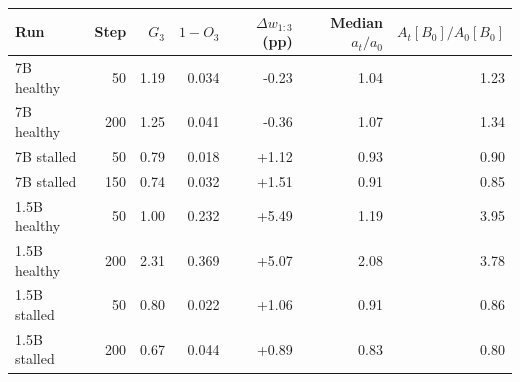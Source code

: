 \begin{tabular}{lrrrrrr}
\toprule
Run & Step & $G_3$ & $1-O_3$ & $\Delta w_{1:3}$ (pp) & Median $a_t/a_0$ & $A_t[B_0]/A_0[B_0]$ \\
\midrule
7B healthy & 50 & 1.19 & 0.034 & -0.23 & 1.04 & 1.23 \\
7B healthy & 200 & 1.25 & 0.041 & -0.36 & 1.07 & 1.34 \\
7B stalled & 50 & 0.79 & 0.018 & +1.12 & 0.93 & 0.90 \\
7B stalled & 150 & 0.74 & 0.032 & +1.51 & 0.91 & 0.85 \\
1.5B healthy & 50 & 1.00 & 0.232 & +5.49 & 1.19 & 3.95 \\
1.5B healthy & 200 & 2.31 & 0.369 & +5.07 & 2.08 & 3.78 \\
1.5B stalled & 50 & 0.80 & 0.022 & +1.06 & 0.91 & 0.86 \\
1.5B stalled & 200 & 0.67 & 0.044 & +0.89 & 0.83 & 0.80 \\
\bottomrule
\end{tabular}
